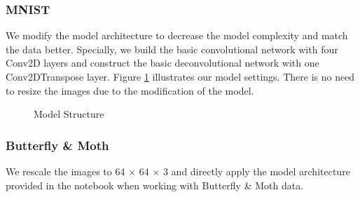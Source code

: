 \documentclass{article}
\begin{document}
\subsubsection{MNIST}
We modify the model architecture to decrease the model complexity and match the data better. Specially, we build the basic convolutional network with four Conv2D layers and construct the basic deconvolutional network with one Conv2DTranspose layer. Figure \ref{fig:3-model} illustrates our model settings. There is no need to resize the images due to the modification of the model.
\begin{figure}[!ht]
    \centering
        \hspace{1.5cm}
    \caption{Model Structure}
    \label{fig:3-model}
\end{figure}

\subsubsection{Butterfly \& Moth}
We rescale the images to 64 $\times$ 64 $\times$ 3 and directly apply the model architecture provided in the notebook when working with Butterfly \& Moth data.
\end{document}
